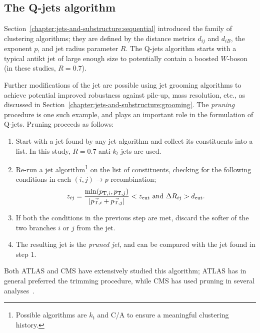 \subsection{The Q-jets algorithm}
\label{app:qjets:intro:algorithm}

Section~\ref{chapter:jets-and-substructure:sequential} introduced the \kt family of clustering algorithms; they are defined by the distance metrics $d_{ij}$ and $d_{iB}$, the exponent $p$, and jet radius parameter $R$. The Q-jets algorithm starts with a typical antikt jet of large enough size to potentially contain a boosted $W$-boson (in these studies, $R=0.7$). 

Further modifications of the jet are possible using jet grooming algorithms to achieve potential improved robustness against pile-up, mass resolution, etc.\cite{Thaler2008,pruning2009,Ellis2009a,Krohn2010}, as discussed in Section~\ref{chapter:jets-and-substructure:grooming}. The \emph{pruning} procedure\cite{Ellis2009a} is one such example, and plays an important role in the formulation of Q-jets. Pruning proceeds as follows:
%
\begin{enumerate}
      \item Start with a jet found by any jet algorithm and collect its constituents into a list. In this study, $R=0.7$ anti-$k_t$ jets are used.%
      \item Re-run a jet algorithm\footnote{Possible algorithms are $k_t$ and C/A to ensure a meaningful clustering history.} on the list of constituents, checking for the following conditions in each $(i,j) \to p$ recombination;
      \begin{equation}
        z_{ij}=\frac{\min(p_{{\rm T},i}, p_{{\rm T},j})}{|\vec{p_{{\rm T},i}}+\vec{p_{{\rm T},j}}|}<z_{\rm cut}~\mathrm{and}~\Delta R_{ij} > d_{\rm cut}.
         \label{eqn:pruning:cuts}
      \end{equation}
      \item If both the conditions in the previous step are met, discard the softer of the two branches $i$ or $j$ from the jet.
      \item The resulting jet is the \emph{pruned jet}, and can be compared with the jet found in step 1.
\end{enumerate}
%
Both ATLAS and CMS have extensively studied this algorithm; ATLAS has in general preferred the trimming procedure, while CMS has used pruning in several analyses~\cite{groomedCONF2011,groomedJetPileup2011,Aad:2013nca,Chatrchyan:2012ypy,Aad:2013gja}.

